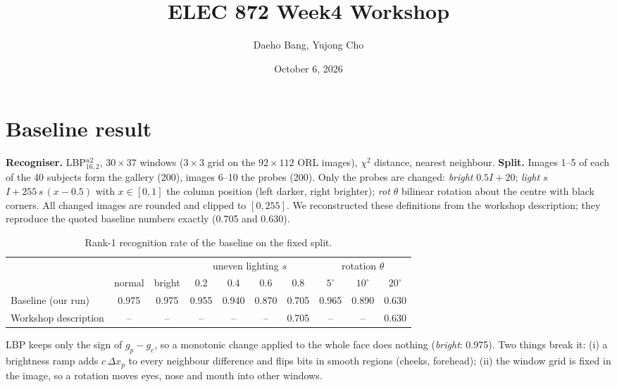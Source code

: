 \documentclass{article}
\title{ELEC 872 Week4 Workshop}
\author{Daeho Bang, Yujong Cho}
\date{October 6, 2026}
\begin{document}
\maketitle
\vspace{-0.8cm}

\section{Baseline result}

\textbf{Recogniser.} LBP$^{u2}_{16,2}$, $30\times37$ windows ($3\times3$ grid on the
$92\times112$ ORL images), $\chi^2$ distance, nearest neighbour.
\textbf{Split.} Images 1--5 of each of the 40 subjects form the gallery (200), images 6--10
the probes (200). Only the probes are changed:
\emph{bright} $0.5I+20$;
\emph{light $s$} $I + 255\,s\,(x-0.5)$ with $x\in[0,1]$ the column position (left darker, right brighter);
\emph{rot $\theta$} bilinear rotation about the centre with black corners.
All changed images are rounded and clipped to $[0,255]$.
We reconstructed these definitions from the workshop description; they reproduce the
quoted baseline numbers exactly (0.705 and 0.630).

\begin{table}[H]
\centering\small
\begin{adjustbox}{max width=\linewidth}
\begin{tabular}{lccccccccc}
\toprule
 & & & \multicolumn{4}{c}{uneven lighting $s$} & \multicolumn{3}{c}{rotation $\theta$} \\
\cmidrule(lr){4-7}\cmidrule(lr){8-10}
 & normal & bright & 0.2 & 0.4 & 0.6 & 0.8 & $5^\circ$ & $10^\circ$ & $20^\circ$ \\
\midrule
Baseline (our run)     & 0.975 & 0.975 & 0.955 & 0.940 & 0.870 & 0.705 & 0.965 & 0.890 & 0.630 \\
Workshop description   & --    & --    & --    & --    & --    & 0.705 & --    & --    & 0.630 \\
\bottomrule
\end{tabular}
\end{adjustbox}
\caption{Rank-1 recognition rate of the baseline on the fixed split.}
\end{table}
\vspace{-0.5cm}

\noindent LBP keeps only the sign of $g_p-g_c$, so a monotonic change applied to the whole
face does nothing (\emph{bright}: 0.975). Two things break it: (i) a brightness ramp adds
$c\,\Delta x_p$ to every neighbour difference and flips bits in smooth regions (cheeks,
forehead); (ii) the window grid is fixed in the image, so a rotation moves eyes, nose and
mouth into other windows.
\end{document}
